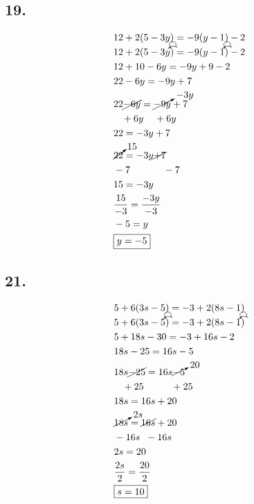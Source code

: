 \documentclass{article}
\newcommand{\tikzmark}[1]{\tikz[overlay,remember picture] \node (#1) {};}
\newcommand{\DrawBox}[2]{%
    \begin{tikzpicture}[overlay,remember picture]
        \draw[->,shorten >=5pt,shorten <=5pt,out=70,in=130,distance=0.5cm,#1] (MarkA.north) to (MarkC.north);
        \draw[->,shorten >=5pt,shorten <=5pt,out=50,in=140,distance=0.3cm,#2] (MarkA.north) to (MarkB.north);
    \end{tikzpicture}
}
\begin{document}
    \subsection*{19.}
    \begin{align*}
        & 12 + 2(5 -3y) = -9(y - 1) - 2 \\
        & 12 + \tikzmark{MarkA}2 (5\tikzmark{MarkB} - 3y\tikzmark{MarkC})\DrawBox{black}{black} = -\tikzmark{MarkA}9 (y\tikzmark{MarkB} - 1\tikzmark{MarkC})\DrawBox{black}{black} - 2 \\
        & 12 + 10 - 6y = -9y + 9 - 2\\
        & 22 - 6y = -9y + 7\\
        & 22 \cancel{- 6y} = \cancelto{-3y}{-9y} + 7 \\
        & \hspace{.3cm}+ 6y \hspace{.4cm}+ 6y \\
        & 22 = -3y + 7 \\
        & \cancelto{15}{22} = -3y \cancel{+ 7} \\
        & -7 \hspace{1.2cm} -7 \\
        & 15 = -3y \\
        & \frac{15}{-3} = \frac{-3y}{-3} \\
        & -5 = y \\
        & \boxed{y = -5}
    \end{align*}

    \subsection*{21.}
    \begin{align*}
        & 5 + 6(3s - 5) = -3 + 2(8s - 1) \\
        & 5 + \tikzmark{MarkA}6 (3s\tikzmark{MarkB} - 5\tikzmark{MarkC})\DrawBox{black}{black} = -3 +\tikzmark{MarkA}2 (8s\tikzmark{MarkB} - 1\tikzmark{MarkC})\DrawBox{black}{black} \\
        & 5 + 18s - 30 = -3 + 16s - 2\\
        & 18s -25 = 16s - 5\\
        & 18s \cancel{- 25} = 16s \cancelto{20}{-5} \\
        & \hspace{.3cm}+ 25 \hspace{1cm}+ 25 \\
        & 18s = 16s + 20 \\
        & \cancelto{2s}{18s} = \cancel{16s} + 20 \\
        & -16s \hspace{.2cm} - 16s\\
        & 2s = 20 \\
        & \frac{2s}{2} = \frac{20}{2} \\
        & \boxed{s = 10}
    \end{align*}
\end{document}
